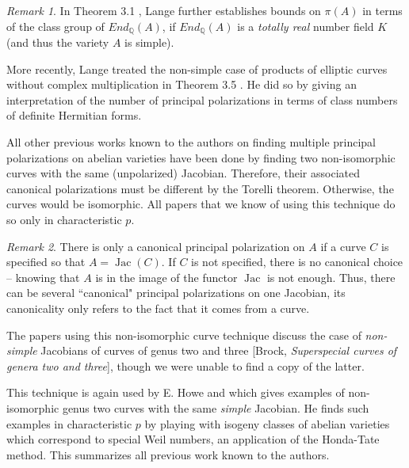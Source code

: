 \documentclass[12pt,reqno]{amsart}
\DeclareMathOperator{\Jac}{Jac}
\newcommand{\Q}{\mathbb{Q}}
\theoremstyle{definition}
\theoremstyle{remark}
\newtheorem*{remark}{Remark}
\begin{document}
\begin{remark} In Theorem 3.1 \cite{several}, Lange further establishes bounds on $\pi(A)$ in terms of the class group of $End_{\Q}(A)$, if $End_{\Q}(A)$ is a \textit{totally real} number field $K$ (and thus the variety $A$ is simple). \end{remark}  

More recently, Lange treated the non-simple case of products of elliptic curves without complex multiplication in Theorem 3.5 \cite{newlange}. He did so by giving an interpretation of the number of principal polarizations in terms of class numbers of definite Hermitian forms.


All other previous works known to the authors on finding multiple principal polarizations on abelian varieties have been done by finding two non-isomorphic curves with the same (unpolarized) Jacobian. Therefore, their associated canonical polarizations must be different by the Torelli theorem. Otherwise, the curves would be isomorphic. All papers that we know of using this technique do so only in characteristic $p$. 

\begin{remark} There is only a canonical principal polarization on $A$ if a curve $C$ is specified so that $A = \Jac(C).$ If $C$ is not specified, there is no canonical choice -- knowing that $A$ is in the image of the functor $\Jac$ is not enough. Thus, there can be several ``canonical" principal polarizations on one Jacobian, its canonicality only refers to the fact that it comes from a curve. \end{remark}

The papers using this non-isomorphic curve technique discuss the case of \textit{non-simple} Jacobians of curves of genus two \cite{iko} and three [Brock, \textit{Superspecial curves of genera two and three}], though we were unable to find a copy of the latter. 

This technique is again used by E. Howe \cite{howe1} and \cite{howe2} which gives examples of non-isomorphic genus two curves with the same \textit{simple} Jacobian. He finds such examples in characteristic $p$ by playing with isogeny classes of abelian varieties which correspond to special Weil numbers, an application of the Honda-Tate method. This summarizes all previous work known to the authors.
\end{document}
